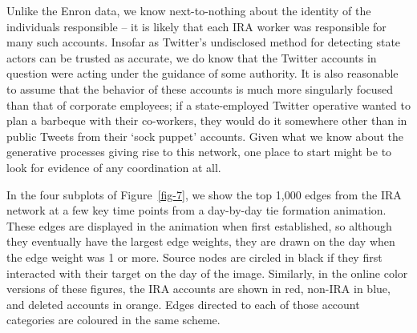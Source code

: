 \documentclass[
  12pt,
  a4paper,
  DIV=11,
  numbers=noendperiod,
  twoside,
  open=any]{scrartcl}
\begin{document}
Unlike the Enron data, we know next-to-nothing about the identity of the
individuals responsible -- it is likely that each IRA worker was
responsible for many such accounts. Insofar as Twitter's undisclosed
method for detecting state actors can be trusted as accurate, we do know
that the Twitter accounts in question were acting under the guidance of
some authority. It is also reasonable to assume that the behavior of
these accounts is much more singularly focused than that of corporate
employees; if a state-employed Twitter operative wanted to plan a
barbeque with their co-workers, they would do it somewhere other than in
public Tweets from their `sock puppet' accounts. Given what we know
about the generative processes giving rise to this network, one place to
start might be to look for evidence of any coordination at all.

In the four subplots of Figure~\ref{fig-7}, we show the top 1,000 edges
from the IRA network at a few key time points from a day-by-day tie
formation animation. These edges are displayed in the animation when
first established, so although they eventually have the largest edge
weights, they are drawn on the day when the edge weight was 1 or more.
Source nodes are circled in black if they first interacted with their
target on the day of the image. Similarly, in the online color versions
of these figures, the IRA accounts are shown in red, non-IRA in blue,
and deleted accounts in orange. Edges directed to each of those account
categories are coloured in the same scheme.
\end{document}
